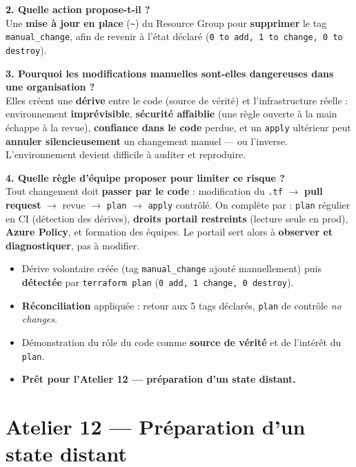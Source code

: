 \documentclass[11pt,a4paper]{article}
\newcommand{\arr}{\ensuremath{\rightarrow}}
\newcommand{\code}[1]{\texttt{#1}}
\begin{document}
\textbf{2. Quelle action propose-t-il ?}\\
Une \textbf{mise à jour en place} (\code{\textasciitilde}) du Resource Group pour \textbf{supprimer} le tag
\code{manual\_change}, afin de revenir à l'état déclaré (\code{0 to add, 1 to change, 0 to destroy}).

\textbf{3. Pourquoi les modifications manuelles sont-elles dangereuses dans une organisation ?}\\
Elles créent une \textbf{dérive} entre le code (source de vérité) et l'infrastructure réelle : environnement
\textbf{imprévisible}, \textbf{sécurité affaiblie} (une règle ouverte à la main échappe à la revue),
\textbf{confiance dans le code} perdue, et un \code{apply} ultérieur peut \textbf{annuler silencieusement} un
changement manuel — ou l'inverse. L'environnement devient difficile à auditer et reproduire.

\textbf{4. Quelle règle d'équipe proposer pour limiter ce risque ?}\\
Tout changement doit \textbf{passer par le code} : modification du \code{.tf} \arr{} \textbf{pull request} \arr{}
revue \arr{} \code{plan} \arr{} \code{apply} contrôlé. On complète par : \code{plan} régulier en CI (détection
des dérives), \textbf{droits portail restreints} (lecture seule en prod), \textbf{Azure Policy}, et formation
des équipes. Le portail sert alors à \textbf{observer et diagnostiquer}, pas à modifier.

\begin{etatbox}
\begin{itemize}
  \item Dérive volontaire créée (tag \code{manual\_change} ajouté manuellement) puis \textbf{détectée} par \code{terraform plan} (\code{0 add, 1 change, 0 destroy}).
  \item \textbf{Réconciliation} appliquée : retour aux 5 tags déclarés, \code{plan} de contrôle \textit{no changes}.
  \item Démonstration du rôle du code comme \textbf{source de vérité} et de l'intérêt du \code{plan}.
  \item \textbf{Prêt pour l'Atelier 12 — préparation d'un state distant.}
\end{itemize}
\end{etatbox}

\section{Atelier 12 — Préparation d'un state distant}
\end{document}
